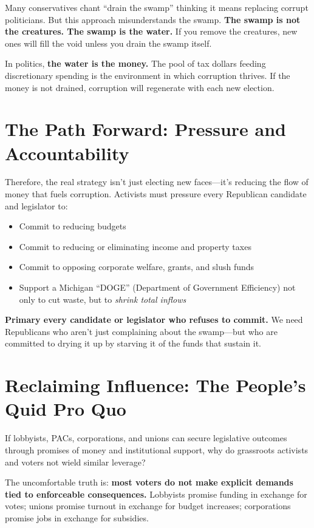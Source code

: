 Many conservatives chant ``drain the swamp'' thinking it means replacing corrupt politicians. But this approach misunderstands the swamp. \textbf{The swamp is not the creatures. The swamp is the water.} If you remove the creatures, new ones will fill the void unless you drain the swamp itself.

In politics, \textbf{the water is the money.} The pool of tax dollars feeding discretionary spending is the environment in which corruption thrives. If the money is not drained, corruption will regenerate with each new election.

\section{The Path Forward: Pressure and Accountability}

Therefore, the real strategy isn’t just electing new faces—it’s reducing the flow of money that fuels corruption. Activists must pressure every Republican candidate and legislator to:

\begin{itemize}
    \item Commit to reducing budgets
    \item Commit to reducing or eliminating income and property taxes
    \item Commit to opposing corporate welfare, grants, and slush funds
    \item Support a Michigan ``DOGE'' (Department of Government Efficiency) not only to cut waste, but to \emph{shrink total inflows}
\end{itemize}

\textbf{Primary every candidate or legislator who refuses to commit.} We need Republicans who aren’t just complaining about the swamp—but who are committed to drying it up by starving it of the funds that sustain it.

\section{Reclaiming Influence: The People's Quid Pro Quo}

If lobbyists, PACs, corporations, and unions can secure legislative outcomes through promises of money and institutional support, why do grassroots activists and voters not wield similar leverage?

The uncomfortable truth is: \textbf{most voters do not make explicit demands tied to enforceable consequences.} Lobbyists promise funding in exchange for votes; unions promise turnout in exchange for budget increases; corporations promise jobs in exchange for subsidies.

